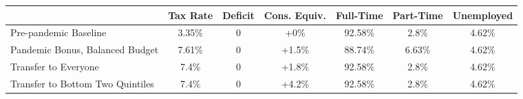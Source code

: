 \begin{center}
\begin{adjustbox}{width=\textwidth}
\begin{tabular}{lcccccc}\toprule
 & Tax Rate & Deficit & Cons. Equiv. & Full-Time & Part-Time & Unemployed \\
\midrule
Pre-pandemic Baseline & 3.35\% & 0 & +0\% & 92.58\% & 2.8\% & 4.62\% \\
Pandemic Bonus, Balanced Budget & 7.61\% & 0 & +1.5\% & 88.74\% & 6.63\% & 4.62\% \\
Transfer to Everyone & 7.4\% & 0 & +1.8\% & 92.58\% & 2.8\% & 4.62\% \\
Transfer to Bottom Two Quintiles & 7.4\% & 0 & +4.2\% & 92.58\% & 2.8\% & 4.62\% \\
\bottomrule\end{tabular}
\end{adjustbox}
\end{center}
